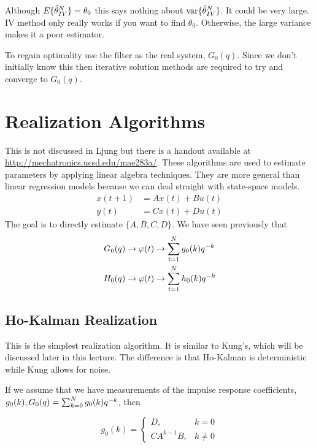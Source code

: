 Although $E\{\hat{\theta}_{IV}^N\}=\theta_0$ this says nothing about $\text{var}\{\hat{\theta}_{IV}^N\}$.
It could be very large.
IV method only really works if you want to find $\theta_0$.
Otherwise, the large variance makes it a poor estimator.

To regain optimality use the filter as the real system, $G_0(q)$.
Since we don't initially know this then iterative solution methods are required to try and converge to $G_0(q)$.

\section{Realization Algorithms}
This is not discussed in Ljung but there is a handout available at \\
\href{http://mechatronics.ucsd.edu/mae283a/}{http://mechatronics.ucsd.edu/mae283a/}.
These algorithms are used to estimate parameters by applying linear algebra techniques.
They are more general than linear regression models because we can deal straight with state-space models.
\begin{align*}
x(t+1) &= Ax(t)+Bu(t) \\
y(t) &= Cx(t)+Du(t)
\end{align*}
The goal is to directly estimate $\{A,B,C,D\}$.
We have seen previously that
\begin{align*}
G_0(q) &\to \varphi(t) \to \sum_{t=1}^N g_0(k)q^{-k} \\
H_0(q) &\to \varphi(t) \to \sum_{t=1}^N h_0(k)q^{-k}
\end{align*}

\subsection{Ho-Kalman Realization}
This is the simplest realization algorithm.
It is similar to Kung's, which will be discussed later in this lecture.
The difference is that Ho-Kalman is deterministic while Kung allows for noise.

If we assume that we have measurements of the impulse response coefficients, $g_0(k), G_0(q)=\sum_{k=0}^N g_0(k)q^{-k}$, then

\begin{equation*}
g_0(k) = \begin{cases} D, & k=0 \\ CA^{k-1}B, & k\neq0 \end{cases}
\end{equation*}

